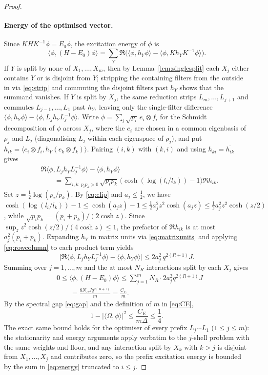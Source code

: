 \documentclass[aps,prx,reprint,superscriptaddress,floatfix,nofootinbib,longbibliography,amsmath,amssymb]{revtex4-2}
\newcommand{\abs}[1]{\lvert #1\rvert}
\newcommand{\Om}{\Omega}
\theoremstyle{plain}
\theoremstyle{definition}
\begin{document}
\begin{proof}
\paragraph{Energy of the optimised vector.}
Since $KHK^{-1}\phi=E_0\phi$, the excitation energy of $\phi$ is
\[
 \langle\phi,(H-E_0)\phi\rangle=\sum_Y\Re\bigl(\langle\phi,h_Y\phi\rangle-\langle\phi,Kh_YK^{-1}\phi\rangle\bigr).
\]
If $Y$ is split by none of $X_1,\dots,X_m$, then by
Lemma~\ref{lem:singlesplit} each $X_j$ either contains $Y$ or is disjoint
from $Y$; stripping the containing filters from the outside in via
\eqref{eq:strip} and commuting the disjoint filters past $h_Y$ shows that
the summand vanishes. If $Y$ is split by $X_j$, the same reduction strips
$L_m,\dots,L_{j+1}$ and commutes $L_{j-1},\dots,L_1$ past $h_Y$, leaving
only the single-filter difference
$\langle\phi,h_Y\phi\rangle-\langle\phi,L_jh_YL_j^{-1}\phi\rangle$. Write
$\phi=\sum_i\sqrt{p_i}\,e_i\otimes f_i$ for the Schmidt decomposition of
$\phi$ across $X_j$, where the $e_i$ are chosen in a common eigenbasis of
$\rho_j$ and $L_j$ (diagonalising $L_j$ within each eigenspace of
$\rho_j$), and put
$h_{ik}=\langle e_i\otimes f_i,h_Y(e_k\otimes f_k)\rangle$. Pairing
$(i,k)$ with $(k,i)$ and using $h_{ki}=\overline{h_{ik}}$ gives
\[
\begin{split}
 &\Re\langle\phi,L_jh_YL_j^{-1}\phi\rangle-\langle\phi,h_Y\phi\rangle\\
 &\qquad=\sum_{i,k:\,p_ip_k>0}\sqrt{p_ip_k}\,\bigl(\cosh(\log(l_i/l_k))-1\bigr)\Re h_{ik}.
\end{split}
\]
Set $z=\frac12\log(p_i/p_k)$. By \eqref{eq:clip} and $a_j\le\frac12$, we
have
$\cosh(\log(l_i/l_k))-1\le\cosh(a_jz)-1\le\frac12a_j^2z^2\cosh(a_jz)\le\frac12a_j^2z^2\cosh(z/2)$,
while $\sqrt{p_ip_k}=(p_i+p_k)/(2\cosh z)$. Since
$\sup_z z^2\cosh(z/2)/(4\cosh z)\le1$, the prefactor of $\Re h_{ik}$ is at
most $a_j^2(p_i+p_k)$. Expanding $h_Y$ in matrix units via
\eqref{eq:matrixunits} and applying \eqref{eq:rowcolumn} to each product
term yields
\[
 \bigl|\Re\langle\phi,L_jh_YL_j^{-1}\phi\rangle-\langle\phi,h_Y\phi\rangle\bigr|
 \le 2a_j^2\,q^{2(R+1)}J .
\]
Summing over $j=1,\dots,m$ and the at most $N_R$ interactions split by
each $X_j$ gives
\begin{equation}\label{eq:energy}
\begin{split}
 &0\le\langle\phi,(H-E_0)\phi\rangle\le\sum_{j=1}^m N_R\cdot 2a_j^2q^{2(R+1)}J\\
 &\qquad=\frac{8N_RJq^{2(R+1)}}{m}=\frac{C_E}{m}.
\end{split}
\end{equation}
By the spectral gap \eqref{eq:gap} and the definition of $m$ in \eqref{eq:CE},
\begin{equation}\label{eq:overlap}
 1-\abs{\langle\Om,\phi\rangle}^2\le\frac{C_E}{m\Delta}\le\frac14 .
\end{equation}
The exact same bound holds for the optimiser of every prefix
$L_j\cdots L_1$ ($1\le j\le m$): the stationarity and energy arguments
apply verbatim to the $j$-shell problem with the same weights and floor,
and any interaction split by $X_k$ with $k>j$ is disjoint from
$X_1,\dots,X_j$ and contributes zero, so the prefix excitation energy is
bounded by the sum in \eqref{eq:energy} truncated to $i\le j$.


\end{proof}
\end{document}
